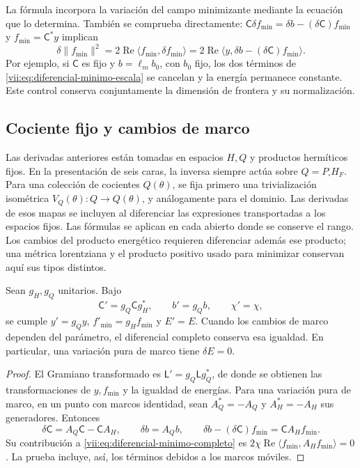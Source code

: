 La fórmula incorpora la variación del campo minimizante mediante la
ecuación que lo determina. También se comprueba directamente:
\(\mathsf C\delta f_{\min}=\delta b-(\delta\mathsf C)f_{\min}\)
y \(f_{\min}=\mathsf C^*y\) implican
\[
 \delta\|f_{\min}\|^2
 =2\operatorname{Re}\langle f_{\min},\delta f_{\min}\rangle
 =2\operatorname{Re}
     \langle y,\delta b-(\delta\mathsf C)f_{\min}\rangle.
\]
Por ejemplo, si \(\mathsf C\) es fijo y \(b=\ell_m b_0\), con
\(b_0\) fijo, los dos términos de
\eqref{vii:eq:diferencial-minimo-escala} se cancelan y la energía
permanece constante. Este control conserva conjuntamente la dimensión
de frontera y su normalización.

\subsection{Cociente fijo y cambios de marco}
\label{vii:subsec:marcos-minimo}

Las derivadas anteriores están tomadas en espacios \(H,Q\) y productos
hermíticos fijos. En la presentación de seis caras, la inversa siempre
actúa sobre \(Q=P_\square H_F\). Para una colección de cocientes
\(Q(\theta)\), se fija primero una trivialización isométrica
\(V_Q(\theta):Q\to Q(\theta)\), y análogamente para el dominio.
Las derivadas de esos mapas se incluyen al diferenciar las expresiones
transportadas a los espacios fijos. Las fórmulas se aplican en cada
abierto donde se conserve el rango. Los cambios del producto energético
requieren diferenciar además ese producto; una métrica lorentziana
y el producto positivo usado para minimizar conservan aquí sus tipos
distintos.

\begin{proposition}
\label{vii:prop:covariancia-minimo}
Sean \(g_H,g_Q\) unitarios. Bajo
\[
 \mathsf C'=g_Q\mathsf C g_H^*,\qquad b'=g_Qb,\qquad \chi'=\chi,
\]
se cumple \(y'=g_Qy\), \(f'_{\min}=g_Hf_{\min}\) y \(E'=E\).
Cuando los cambios de marco dependen del parámetro, el diferencial
completo conserva esa igualdad. En particular, una variación pura de
marco tiene \(\delta E=0\).
\end{proposition}

\begin{proof}
El Gramiano transformado es \(\mathsf L'=g_Q\mathsf Lg_Q^*\),
de donde se obtienen las transformaciones de \(y,f_{\min}\) y
la igualdad de energías. Para una variación pura de marco, en un punto
con marcos identidad, sean \(A_Q^*=-A_Q\) y \(A_H^*=-A_H\)
sus generadores. Entonces
\[
 \delta\mathsf C=A_Q\mathsf C-\mathsf C A_H,\qquad
 \delta b=A_Qb,\qquad
 \delta b-(\delta\mathsf C)f_{\min}=\mathsf C A_Hf_{\min}.
\]
Su contribución a \eqref{vii:eq:diferencial-minimo-completo} es
\(2\chi\operatorname{Re}\langle f_{\min},A_Hf_{\min}\rangle=0\).
La prueba incluye, así, los términos debidos a los marcos móviles.
\end{proof}

